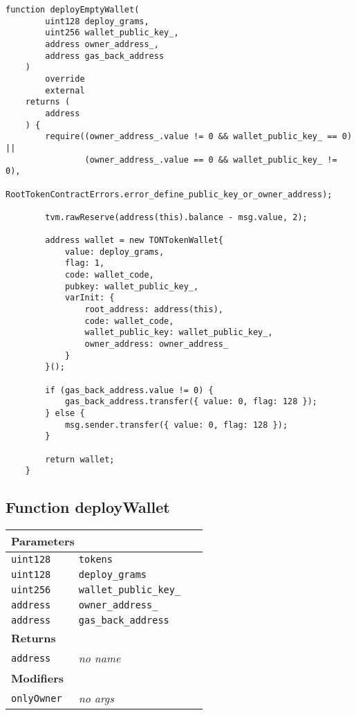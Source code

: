 \begin{lstlisting}[firstnumber=237]
    function deployEmptyWallet(
        uint128 deploy_grams,
        uint256 wallet_public_key_,
        address owner_address_,
        address gas_back_address
    )
        override
        external
    returns (
        address
    ) {
        require((owner_address_.value != 0 && wallet_public_key_ == 0) ||
                (owner_address_.value == 0 && wallet_public_key_ != 0),
                RootTokenContractErrors.error_define_public_key_or_owner_address);

        tvm.rawReserve(address(this).balance - msg.value, 2);

        address wallet = new TONTokenWallet{
            value: deploy_grams,
            flag: 1,
            code: wallet_code,
            pubkey: wallet_public_key_,
            varInit: {
                root_address: address(this),
                code: wallet_code,
                wallet_public_key: wallet_public_key_,
                owner_address: owner_address_
            }
        }();

        if (gas_back_address.value != 0) {
            gas_back_address.transfer({ value: 0, flag: 128 });
        } else {
            msg.sender.transfer({ value: 0, flag: 128 });
        }

        return wallet;
    }
\end{lstlisting}

\subsection{Function deployWallet}


\ifsoltables
\noindent\begin{tabular}{|l|l|p{5cm}|}\hline
\multicolumn{3}{|l|}{\bf Parameters}\\\hline
\tt uint128 & \tt tokens &\\\hline
\tt uint128 & \tt deploy\_{}grams &\\\hline
\tt uint256 & \tt wallet\_{}public\_{}key\_{} &\\\hline
\tt address & \tt owner\_{}address\_{} &\\\hline
\tt address & \tt gas\_{}back\_{}address &\\\hline
\multicolumn{3}{|l|}{\bf Returns}\\\hline
\tt address & {\em no name} &\\\hline
\multicolumn{3}{|l|}{\bf Modifiers}\\\hline
\tt onlyOwner & {\em no args} &\\\hline
\end{tabular}
\fi

